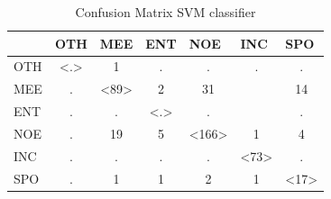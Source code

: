 \documentclass[
10pt, %
a4paper, %
oneside, %
headinclude,footinclude, %
BCOR5mm, %
]{scrartcl}
\begin{document}
\begin{table}[h]
 \centering
\caption[Confusion Matrix SVM classifier]{Confusion Matrix SVM classifier }
\begin{tabular}{|l|c|c|c|c|c|c|}
\hline
    & \multicolumn{1}{l|}{OTH} & \multicolumn{1}{l|}{MEE} & \multicolumn{1}{l|}{ENT} & \multicolumn{1}{l|}{NOE} & \multicolumn{1}{l|}{INC} & \multicolumn{1}{l|}{SPO} \\ \hline
OTH & \textless.\textgreater   & 1                        & .                        & .                        & .                        & .                        \\ \hline
MEE & .                        & \textless89\textgreater  & 2                        & 31                       &                          & 14                       \\ \hline
ENT & .                        & .                        & \textless.\textgreater   & .                        &                          & .                        \\ \hline
NOE & .                        & 19                       & 5                        & \textless166\textgreater & 1                        & 4                        \\ \hline
INC & .                        & .                        & .                        & .                        & \textless73\textgreater  & .                        \\ \hline
SPO & .                        & 1                        & 1                        & 2                        & 1                        & \textless17\textgreater  \\ \hline
\end{tabular}

\end{table}

\newpage


\end{document}

